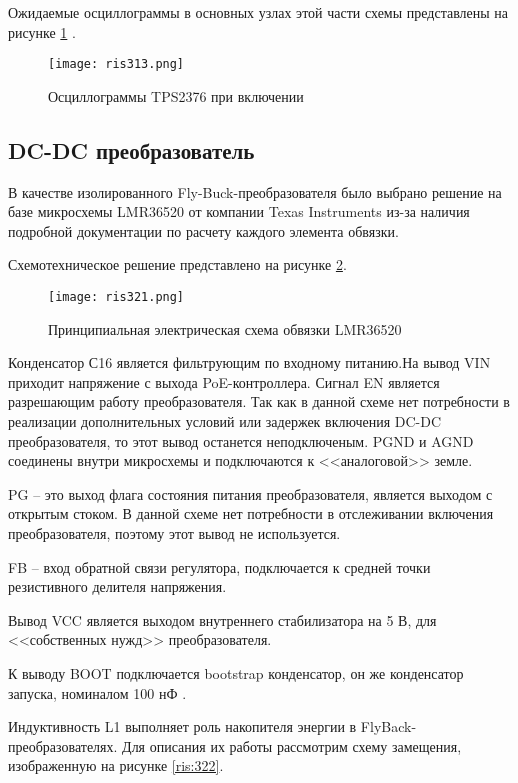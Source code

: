 Ожидаемые осциллограммы в основных узлах этой части схемы представлены на рисунке 
\ref{ris:313} \cite{TPS2376:datasheet}.

\begin{figure}[H]
    \centering
    \texttt{[image: ris313.png]}
    \caption{Осциллограммы TPS2376 при включении}
    \label{ris:313}
\end{figure}

\subsection{DC-DC преобразователь}
\hspace{1cm} 

В качестве изолированного Fly-Buck-преобразователя было выбрано решение на базе микросхемы LMR36520 
от компании Texas Instruments из-за наличия подробной документации по расчету каждого элемента
обвязки. 

Схемотехническое решение представлено на рисунке \ref{ris:321}.

\begin{figure}[H]
    \centering
    \texttt{[image: ris321.png]}
    \caption{Принципиальная электрическая схема обвязки LMR36520}
    \label{ris:321}
\end{figure}

Конденсатор С16 является фильтрующим по входному питанию.На вывод VIN приходит напряжение
с выхода PoE-контроллера. Сигнал EN является разрешающим работу преобразователя. Так как
в данной схеме нет потребности в реализации дополнительных условий или задержек включения
DC-DC преобразователя, то этот вывод останется неподключеным. PGND и AGND соединены внутри 
микросхемы и подключаются к <<аналоговой>> земле. 

PG -- это выход флага состояния питания преобразователя, является выходом с открытым стоком. 
В данной схеме нет потребности в отслеживании включения преобразователя, поэтому этот вывод не 
используется. 

FB -- вход обратной связи регулятора, подключается к средней точки резистивного делителя
напряжения.

Вывод VCC является выходом внутреннего стабилизатора на 5 В, для <<собственных нужд>> преобразователя.

К выводу BOOT подключается bootstrap конденсатор, он же конденсатор запуска, номиналом 100 нФ 
\cite{LMR36520:datasheet}. 

Индуктивность L1 выполняет роль накопителя энергии в FlyBack-преобразователях.
Для описания их работы рассмотрим схему замещения, изображенную на рисунке \ref{ris:322}.

